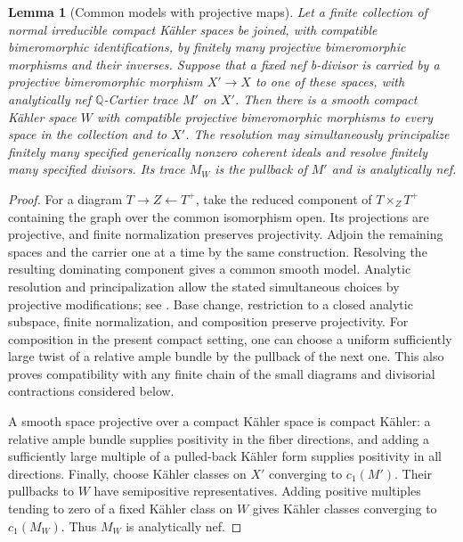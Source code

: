 \documentclass[11pt]{amsart}
\newtheorem{lemma}[theorem]{Lemma}
\theoremstyle{definition}
\theoremstyle{remark}
\numberwithin{equation}{section}
\newcommand{\Q}{\mathbb{Q}}
\begin{document}
\begin{lemma}[Common models with projective maps]\label{lem:common-projective-models}
Let a finite collection of normal irreducible compact K\"ahler spaces
be joined, with compatible bimeromorphic identifications, by finitely
many projective bimeromorphic morphisms and their inverses.  Suppose
that a fixed nef b-divisor is carried by a projective bimeromorphic
morphism $X'\to X$ to one of these spaces, with analytically nef
$\Q$-Cartier trace $M'$ on $X'$.  Then there is a
smooth compact K\"ahler space $W$ with compatible projective
bimeromorphic morphisms to every space in the collection and to $X'$.
The resolution may simultaneously principalize finitely many specified
generically nonzero coherent ideals and resolve finitely many specified divisors.  Its trace
$M_W$ is the pullback of $M'$ and is analytically nef.
\end{lemma}

\begin{proof}
For a diagram $T\to Z\leftarrow T^+$, take the reduced component of
$T\times_ZT^+$ containing the graph over the common isomorphism open.
Its projections are projective, and finite normalization preserves
projectivity.  Adjoin the remaining spaces and the carrier one at a
time by the same construction.  Resolving the resulting dominating
component gives a common smooth model.  Analytic resolution and
principalization allow the stated simultaneous choices by projective
modifications; see \cite[Theorems~1.6, 1.10 and 13.2(1)]{BierstoneMilman1997}.
Base change, restriction to a closed analytic subspace, finite
normalization, and composition preserve projectivity.  For composition
in the present compact setting, one can choose a uniform sufficiently
large twist of a relative ample bundle by the pullback of the next one.
This also proves compatibility with any finite chain of the small
diagrams and divisorial contractions considered below.

A smooth space projective over a compact K\"ahler space is compact
K\"ahler: a relative ample bundle supplies positivity in the fiber
directions, and adding a sufficiently large multiple of a pulled-back
K\"ahler form supplies positivity in all directions.  Finally, choose
K\"ahler classes on $X'$ converging to $c_1(M')$.  Their pullbacks to
$W$ have semipositive representatives.  Adding positive multiples
tending to zero of a fixed K\"ahler class on $W$ gives K\"ahler classes
converging to $c_1(M_W)$.  Thus $M_W$ is analytically nef.
\end{proof}
\end{document}

